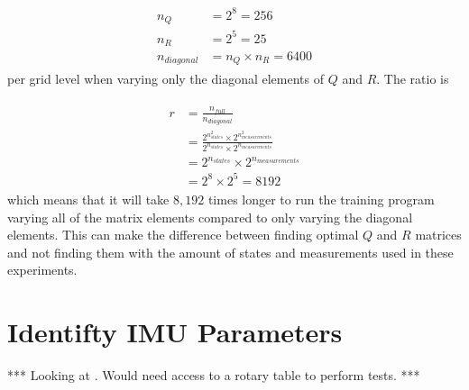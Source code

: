 \begin{align*}
\begin{split}
n_Q &= 2^8 = 256 \\
n_R &= 2^5 = 25 \\
n_{diagonal} &= n_Q \times n_R = 6400
\end{split}
\end{align*}
per grid level when varying only the diagonal elements of $Q$ and $R$. The ratio is

\begin{align}
\label{eq:trainingRatio}
\begin{split}
r &= \frac{n_{full}}{n_{diagonal}} \\
&= \frac{2^{n_{states}^2} \times 2^{n_{measurements}^2}}{2^{n_{states}} \times 2^{n_{measurements}}} \\
&= 2^{n_{states}} \times 2^{n_{measurements}} \\
&= 2^8 \times 2^5 = 8192
\end{split}
\end{align}
which means that it will take $8,192$ times longer to run the training program varying all of the matrix elements compared to only varying the diagonal elements. This can make the difference between finding optimal $Q$ and $R$ matrices and not finding them with the amount of states and measurements used in these experiments.

\section{Identifty IMU Parameters}
\label{sec:identifyimuparams}
*** Looking at \cite{ChungOjeda01}. Would need access to a rotary table to perform tests. ***